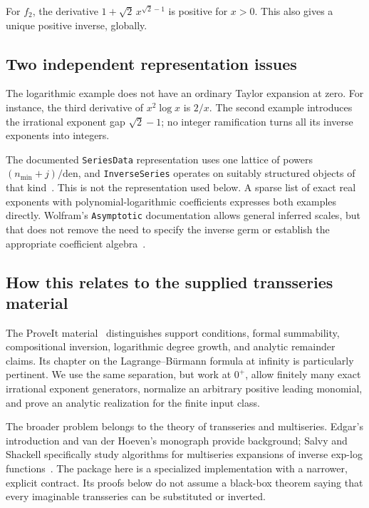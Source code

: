 \documentclass[11pt,a4paper]{article}
\numberwithin{equation}{section}
\theoremstyle{definition}\newtheorem{definition}[theorem]{Definition}
\theoremstyle{remark}\newtheorem{remark}[theorem]{Remark}
\DeclareRobustCommand{\code}[1]{{\small\ttfamily\urlstyle{same}\nolinkurl{#1}}}
\begin{document}
For \(f_2\), the derivative \(1+\sqrt2\,x^{\sqrt2-1}\) is positive for
\(x>0\). This also gives a unique positive inverse, globally.

\subsection{Two independent representation issues}
The logarithmic example does not have an ordinary Taylor expansion at zero.
For instance, the third derivative of \(x^2\log x\) is \(2/x\). The second
example introduces the irrational exponent gap \(\sqrt2-1\); no integer
ramification turns all its inverse exponents into integers.

The documented \code{SeriesData} representation uses one lattice of powers
\((n_{\min}+j)/\mathrm{den}\), and \code{InverseSeries} operates on suitably
structured objects of that kind~\cite{seriesdata,inverseseries}. This is not
the representation used below. A sparse list of exact real exponents with
polynomial-logarithmic coefficients expresses both examples directly.
Wolfram's \code{Asymptotic} documentation allows general inferred scales,
but that does not remove the need to specify the inverse germ or establish
the appropriate coefficient algebra~\cite{asymptotic}.

\subsection{How this relates to the supplied transseries material}
The ProveIt material~\cite{proveit} distinguishes support conditions, formal
summability, compositional inversion, logarithmic degree growth, and
analytic remainder claims. Its chapter on the Lagrange--B\"urmann formula at
infinity is particularly pertinent. We use the same separation, but work at
\(0^+\), allow finitely many exact irrational exponent generators, normalize
an arbitrary positive leading monomial, and prove an analytic realization
for the finite input class.

The broader problem belongs to the theory of transseries and multiseries.
Edgar's introduction and van der Hoeven's monograph provide background;
Salvy and Shackell specifically study algorithms for multiseries expansions
of inverse exp-log functions~\cite{edgar,hoeven,salvy}. The package here is a
specialized implementation with a narrower, explicit contract. Its proofs
below do not assume a black-box theorem saying that every imaginable
transseries can be substituted or inverted.
\end{document}
